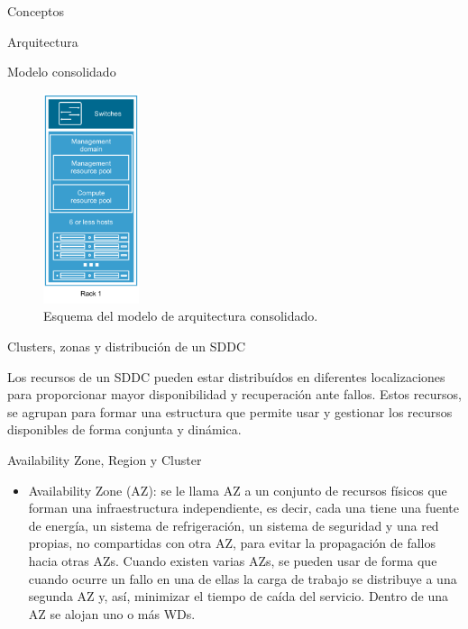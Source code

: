 \begin{section}{Conceptos}
\begin{subsection}{Arquitectura}
\begin{subsubsection}{Modelo consolidado}
\begin{figure}[h!]
  \centering
  \includegraphics[width=0.25\textwidth]{imaxes/conceptosPrevios/modelConsolidated.png}
  \caption{Esquema del modelo de arquitectura consolidado.}
  \label{fig:modeloconsolidated}
\end{figure}

\FloatBarrier

\end{subsubsection}
\end{subsection}

\begin{subsection}{Clusters, zonas y distribución de un SDDC}

  Los recursos de un SDDC pueden estar distribuídos en diferentes localizaciones para proporcionar mayor disponibilidad y recuperación ante fallos. Estos recursos, se agrupan para formar una estructura que permite usar y gestionar los recursos disponibles de forma conjunta y dinámica.

\begin{subsubsection}{Availability Zone, Region y Cluster}
\begin{itemize}
  \item Availability Zone (AZ): se le llama AZ a un conjunto de recursos físicos que forman una infraestructura independiente, es decir, cada una tiene una fuente de energía, un sistema de refrigeración, un sistema de seguridad y una red propias, no compartidas con otra AZ, para evitar la propagación de fallos hacia otras AZs. Cuando existen varias AZs, se pueden usar de forma que cuando ocurre un fallo en una de ellas la carga de trabajo se distribuye a una segunda AZ y, así, minimizar el tiempo de caída del servicio. Dentro de una AZ se alojan uno o más WDs.
  

\end{itemize}
\end{subsubsection}
\end{subsection}
\end{section}
